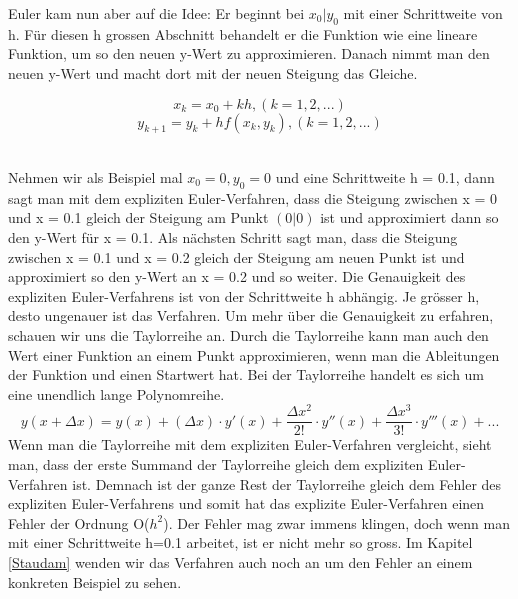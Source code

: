 \documentclass[a4paper,12pt]{report}
\begin{document}
\noindent
Euler kam nun aber auf die Idee: Er beginnt bei $x_0\vert y_0$ mit einer Schrittweite von h. Für diesen h grossen Abschnitt behandelt er die Funktion wie eine lineare Funktion, um so den neuen y-Wert zu approximieren. Danach nimmt man den neuen y-Wert und macht dort mit der neuen Steigung das Gleiche.

\begin{equation*}
x_k = x_0 + kh, (k = 1, 2, ...)
\end{equation*}
\begin{equation*}
y_{k+1} = y_k + hf(x_k, y_k),	(k= 1, 2, ...)
\end{equation*}

\noindent
\\Nehmen wir als Beispiel mal $x_0 = 0, y_0 = 0$ und eine Schrittweite h = 0.1, dann sagt man mit dem expliziten Euler-Verfahren, dass die Steigung zwischen x = 0 und x = 0.1 gleich der Steigung am Punkt $(0\vert0)$ ist und approximiert dann so den y-Wert für x = 0.1. Als nächsten Schritt sagt man, dass die Steigung zwischen x = 0.1 und x = 0.2 gleich der Steigung am neuen Punkt ist und approximiert so den y-Wert an x = 0.2 und so weiter. Die Genauigkeit des expliziten Euler-Verfahrens ist von der Schrittweite h abhängig. Je grösser h, desto ungenauer ist das Verfahren. Um mehr über die Genauigkeit zu erfahren, schauen wir uns die Taylorreihe an. Durch die Taylorreihe kann man auch den Wert einer Funktion an einem Punkt approximieren, wenn man die Ableitungen der Funktion und einen Startwert hat. Bei der Taylorreihe handelt es sich um eine unendlich lange Polynomreihe.
\begin{equation*}
y(x + \Delta x) = y(x) + (\Delta x) \cdot y'(x) + \frac{\Delta x^2}{2!} \cdot y''(x) + \frac{\Delta x^3}{3!} \cdot y'''(x) +... 
\end{equation*}
Wenn man die Taylorreihe mit dem expliziten Euler-Verfahren vergleicht, sieht man, dass der erste Summand der Taylorreihe gleich dem expliziten Euler-Verfahren ist. Demnach ist der ganze Rest der Taylorreihe gleich dem Fehler des expliziten Euler-Verfahrens und somit hat das explizite Euler-Verfahren einen Fehler der Ordnung O($h^2$). Der Fehler mag zwar immens klingen, doch wenn man mit einer Schrittweite h=0.1 arbeitet, ist er nicht mehr so gross. Im Kapitel \ref{Staudam} wenden wir das Verfahren auch noch an um den Fehler an einem konkreten Beispiel zu sehen. \cite[Bourg S. 174-180]{Bourg} \cite[Schwarz S. 413-419]{Schwarz}
\end{document}
